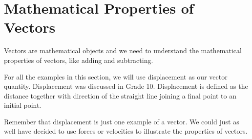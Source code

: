 
\section{Mathematical Properties of Vectors}

%
%
%


Vectors are mathematical objects and we need to understand the mathematical properties of vectors, like adding and subtracting. 

For all the examples in this section, we will use displacement as our vector quantity. Displacement was discussed in 
Grade 10.%
 Displacement is defined as the distance together with direction of the straight line joining a final point to an initial point. 

Remember that displacement is just one example of a vector. We could just as well have decided to use forces or velocities to illustrate the properties of vectors.

